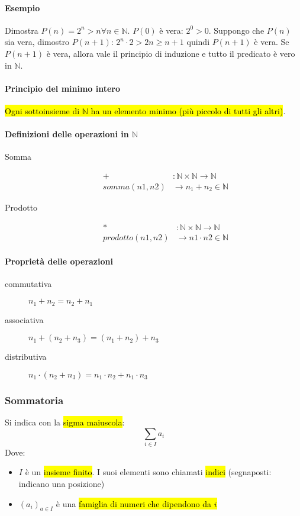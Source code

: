 \documentclass[a4paper,12pt,oneside]{article}
\begin{document}
\paragraph{Esempio} Dimostra $P(n) = 2^n > n \forall n \in \mathbb{N}$. $P(0)$ è vera: 
$2^0 > 0$. Suppongo che $P(n)$ sia vera, dimostro $P(n+1)$: $2^n \cdot 2 > 2n \geq n+1$
quindi $P(n+1)$ è vera. Se $P(n+1)$ è vera, allora vale il principio di induzione
e tutto il predicato è vero in $\mathbb{N}$.

\paragraph{Principio del minimo intero} \hl{Ogni sottoinsieme di 
$\mathbb{N}$ ha un elemento minimo (più piccolo di tutti gli altri)}.

\paragraph{Definizioni delle operazioni in $\mathbb{N}$}
\begin{description}
    \item[Somma] 
        \begin{align*}
            + &: \mathbb{N} \times \mathbb{N} \to \mathbb{N} \\
            somma(n1, n2) &\to n_1 + n_2 \in \mathbb{N}
        \end{align*}
    \item[Prodotto] 
        \begin{align*}
            * &: \mathbb{N} \times \mathbb{N} \to \mathbb{N} \\
            prodotto(n1, n2) &\to n1 \cdot n2 \in \mathbb{N}
        \end{align*}
\end{description}

\paragraph{Proprietà delle operazioni}
\begin{description}
    \item[commutativa] $n_1 + n_2 = n_2 + n_1$
    \item[associativa] $n_1 + (n_2 + n_3) = (n_1 + n_2) + n_3$
    \item[distributiva] $n_1 \cdot (n_2 + n_3) = n_1 \cdot n_2 + n_1 \cdot n_3$
\end{description}

\subsubsection{Sommatoria}
Si indica con la \hl{sigma maiuscola}:
\[
    \sum_{i \in I} a_i
\]
Dove:
\begin{itemize}
    \item $I$ è un \hl{insieme finito}. I suoi elementi sono chiamati 
        \hl{indici} (segnaposti: indicano una posizione)
    \item $(a_i)_{a \in I}$ è una \hl{famiglia di numeri che dipendono da $i$}
\end{itemize}
\end{document}
